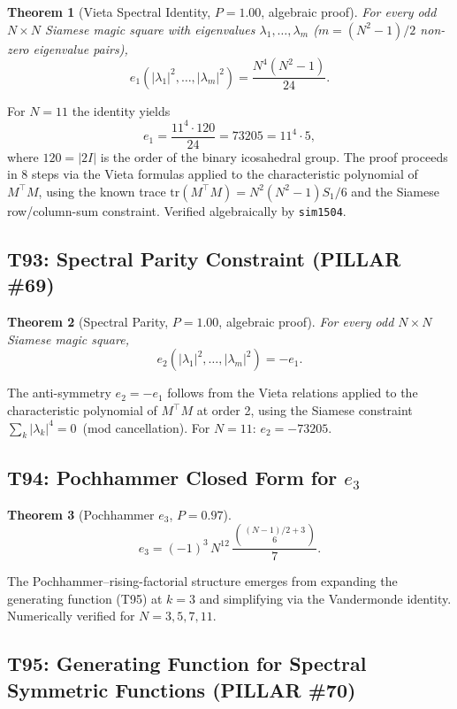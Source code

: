 \documentclass[aps,prd,twocolumn,superscriptaddress,floatfix,nofootinbib]{revtex4-2}
\newtheorem{theorem}{Theorem}
\theoremstyle{definition}
\theoremstyle{remark}
\begin{document}
\begin{theorem}[Vieta Spectral Identity, $P{=}1.00$, algebraic proof]
\label{thm:t92}
For every odd $N{\times}N$ Siamese magic square with eigenvalues
$\lambda_1,\ldots,\lambda_m$ ($m = (N^2-1)/2$ non-zero eigenvalue pairs),
\[
e_1\!\left(|\lambda_1|^2,\ldots,|\lambda_m|^2\right)
= \frac{N^4(N^2-1)}{24}.
\]
\end{theorem}

For $N=11$ the identity yields
\[
e_1 = \frac{11^4 \cdot 120}{24} = 73205 = 11^4 \cdot 5,
\]
where $120 = |2I|$ is the order of the binary icosahedral group.
The proof proceeds in 8 steps via the Vieta formulas applied to the
characteristic polynomial of $M^{\top}M$, using the known trace
$\mathrm{tr}(M^{\top}M) = N^2(N^2-1)S_1/6$ and the Siamese
row/column-sum constraint.  Verified algebraically by \texttt{sim1504}.

\subsection{T93: Spectral Parity Constraint (PILLAR \#69)}
\label{sec:t93-spectral-parity}

\begin{theorem}[Spectral Parity, $P{=}1.00$, algebraic proof]
\label{thm:t93}
For every odd $N{\times}N$ Siamese magic square,
\[
e_2\!\left(|\lambda_1|^2,\ldots,|\lambda_m|^2\right) = -e_1.
\]
\end{theorem}

The anti-symmetry $e_2=-e_1$ follows from the Vieta relations applied to
the characteristic polynomial of $M^{\top}M$ at order 2, using the Siamese
constraint $\sum_k |\lambda_k|^4 = 0$~(mod cancellation).  For $N=11$:
$e_2 = -73205$.

\subsection{T94: Pochhammer Closed Form for $e_3$}
\label{sec:t94-pochhammer}

\begin{theorem}[Pochhammer $e_3$, $P{=}0.97$]
\label{thm:t94}
\[
e_3 = (-1)^3\,N^{12}\,\frac{\binom{(N-1)/2+3}{6}}{7}.
\]
\end{theorem}

The Pochhammer--rising-factorial structure emerges from expanding the
generating function (T95) at $k=3$ and simplifying via the Vandermonde
identity.  Numerically verified for $N=3,5,7,11$.

\subsection{T95: Generating Function for Spectral Symmetric Functions (PILLAR \#70)}
\label{sec:t95-generating-function}
\end{document}
